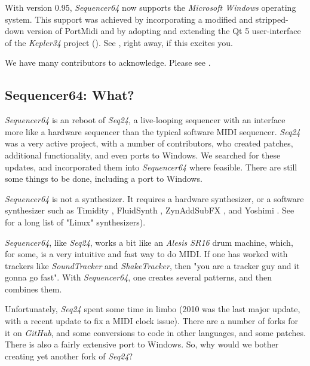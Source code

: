 \documentclass[
 11pt,
 twoside,
 a4paper,
 headinclude,
 footinclude,
 final                                 %
]{article}
\begin{document}
   With version 0.95, \textsl{Sequencer64} now supports the
   \textsl{Microsoft Windows} operating system.  This support was achieved by
   incorporating a modified and stripped-down version of PortMidi and by
   adopting and extending the Qt 5 user-interface of the
   \textsl{Kepler34} project (\cite{kepler34}).
   See , right away, if this excites you.

   We have many contributors to acknowledge.  Please see
   .

\subsection{Sequencer64: What?}
\label{subsec:what_is_sequencer64}

   \textsl{Sequencer64} is an reboot of \textsl{Seq24},
   a live-looping sequencer with an interface more like a hardware sequencer
   than the typical software MIDI sequencer.
   \textsl{Seq24} was a very active project, with a
   number of contributors, who created patches, additional
   functionality, and even ports to Windows.
   We searched for these updates, and
   incorporated them into \textsl{Sequencer64} where feasible.
   There are still some things to be done, including a port to Windows.

   \textsl{Sequencer64} is not a synthesizer.  It requires a hardware
   synthesizer, or a software synthesizer such as Timidity \cite{timidity},
   FluidSynth \cite{fluidsynth}, ZynAddSubFX \cite{zynaddsubfx}, and Yoshimi
   \cite{yoshimi} \cite{yoshimi2}.
   See \cite{linuxsynths} for a long list of "Linux" synthesizers).

   \textsl{Sequencer64}, like \textsl{Seq24},
   works a bit like an \textsl{Alesis SR16} drum machine,
   which, for some, is a very intuitive and fast way to do MIDI.
   If one has worked with trackers like \textsl{SoundTracker} and
   \textsl{ShakeTracker}, then "you are a tracker guy and it gonna go fast".
   With \textsl{Sequencer64}, one creates several patterns, and then
   combines them.

   Unfortunately, \textsl{Seq24} spent some time in limbo
   (2010 was the last major update, with a
   recent update to fix a MIDI clock issue).  There are a number of
   forks for it on \textsl{GitHub}, and some conversions
   to code in other languages, and some patches.
   There is also a fairly extensive port to Windows.
   So, why would we bother creating yet another fork of \textsl{Seq24}?
\end{document}
